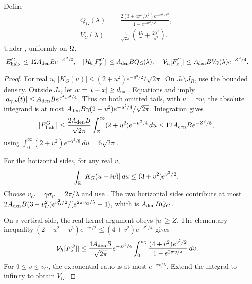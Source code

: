 \begin{proposition}
\label{prop:gelu-errors}
Define
\begin{align}
 Q_G(\lambda)&=\frac{2(3+4\pi^2/\lambda^2)e^{-2\pi^2/\lambda^2}}
                    {1-e^{-4\pi^2/\lambda^2}},\nonumber\\
 V_G(\lambda)&=\frac4{\sqrt{2\pi}}
                 \left(\frac{4\lambda}\pi+\frac{2\lambda^3}{\pi^3}\right).
 \label{eq:gelu-allowances}
\end{align}
Under , uniformly on $\Omega$,
\begin{equation}
 |E_{\rm halo}^G|\le12A_{\rm den}B e^{-Z^2/8},\quad
 |\mathcal H_h[F_x^G]|\le A_{\rm den}B Q_G(\lambda),\quad
 |\mathcal V_h[F_x^G]|\le A_{\rm den}B V_G(\lambda)e^{-Z^2/4}.
 \label{eq:gelu-errors}
\end{equation}
\end{proposition}
\begin{proof}
For real $u$,
$|K_G(u)|\le(2+u^2)e^{-u^2/2}/\sqrt{2\pi}$.
On $J_*\setminus J_R$, use the bounded density. Outside $J_*$, let
$w=|t-x|\ge d_{\rm ext}$. Equations  and
 imply
$|a_{\gamma,\nu}(t)|\le A_{\rm den}B e^{\gamma^2w^2/4}$.
Thus on both omitted tails, with $u=\gamma w$, the absolute integrand is at
most $A_{\rm den}B\gamma(2+u^2)e^{-u^2/4}/\sqrt{2\pi}$. Integration gives
\[
 |E_{\rm halo}^G|\le\frac{2A_{\rm den}B}{\sqrt{2\pi}}
 \int_Z^\infty(2+u^2)e^{-u^2/4}\,du
 \le12A_{\rm den}B e^{-Z^2/8},
\]
using $\int_0^\infty(2+u^2)e^{-u^2/8}\,du=6\sqrt{2\pi}$.

For the horizontal sides, for any real $v$,
\[
 \int_\mathbb R |K_G(u+iv)|\,du\le(3+v^2)e^{v^2/2}.
\]
Choose $v_G=\gamma\sigma_G=2\pi/\lambda$ and use .
The two horizontal sides contribute at most
$2A_{\rm den}B(3+v_G^2)e^{v_G^2/2}/(e^{2\pi v_G/\lambda}-1)$,
which is $A_{\rm den}B Q_G$.

On a vertical side, the real kernel argument obeys $|u|\ge Z$.
The elementary inequality
$(2+u^2+v^2)e^{-u^2/2}\le(4+v^2)e^{-Z^2/4}$ gives
\[
 |\mathcal V_h[F_x^G]|\le
 \frac{4A_{\rm den}B}{\sqrt{2\pi}}e^{-Z^2/4}
 \int_0^{v_G}\frac{(4+v^2)e^{v^2/2}}{1+e^{2\pi v/\lambda}}\,dv.
\]
For $0\le v\le v_G$, the exponential ratio is at most $e^{-\pi v/\lambda}$.
Extend the integral to infinity to obtain $V_G$.
\end{proof}

